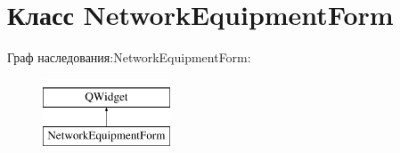 \hypertarget{class_network_equipment_form}{}\section{Класс Network\+Equipment\+Form}
\label{class_network_equipment_form}
Граф наследования\+:Network\+Equipment\+Form\+:\begin{figure}[H]
\begin{center}
\leavevmode
\includegraphics[height=2.000000cm]{class_network_equipment_form}
\end{center}
\end{figure}
